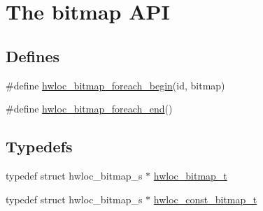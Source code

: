\hypertarget{a00065}{
\section{The bitmap API}
\label{a00065}
}
\subsection*{Defines}
\begin{DoxyCompactItemize}
\item 
\#define \hyperlink{a00065_ga3f6861045a8029ade373510ffa727d2a}{hwloc\_\-bitmap\_\-foreach\_\-begin}(id, bitmap)
\item 
\#define \hyperlink{a00065_gafcf3246db406218d4e155735b3fa6528}{hwloc\_\-bitmap\_\-foreach\_\-end}()
\end{DoxyCompactItemize}
\subsection*{Typedefs}
\begin{DoxyCompactItemize}
\item 
typedef struct hwloc\_\-bitmap\_\-s $\ast$ \hyperlink{a00065_gaa3c2bf4c776d603dcebbb61b0c923d84}{hwloc\_\-bitmap\_\-t}
\item 
typedef struct hwloc\_\-bitmap\_\-s $\ast$ \hyperlink{a00065_ga2fb1bbc8aea1ea22dee2f0fd39659f48}{hwloc\_\-const\_\-bitmap\_\-t}
\end{DoxyCompactItemize}
